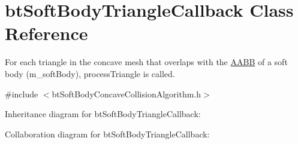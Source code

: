 \hypertarget{classbt_soft_body_triangle_callback}{\section{bt\+Soft\+Body\+Triangle\+Callback Class Reference}
\label{classbt_soft_body_triangle_callback}
}


For each triangle in the concave mesh that overlaps with the \hyperlink{class_a_a_b_b}{A\+A\+B\+B} of a soft body (m\+\_\+soft\+Body), process\+Triangle is called.  




{\ttfamily \#include $<$bt\+Soft\+Body\+Concave\+Collision\+Algorithm.\+h$>$}



Inheritance diagram for bt\+Soft\+Body\+Triangle\+Callback\+:


Collaboration diagram for bt\+Soft\+Body\+Triangle\+Callback\+:
